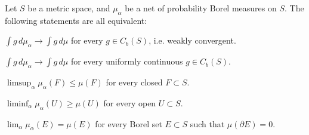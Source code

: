 \documentclass[10pt]{article}
\begin{document}
\begin{lem}
Let $S$ be a metric space, and $\mu_\alpha$ be a net of probability Borel measures on $S$.
The following statements are all equivalent:
\begin{parts}
\item $\int g\,d\mu_\alpha\to\int g\,d\mu$ for every $g\in C_b(S)$, i.e. weakly convergent.
\item $\int g\,d\mu_\alpha\to\int g\,d\mu$ for every uniformly continuous $g\in C_b(S)$.
\item $\limsup_{\alpha}\mu_\alpha(F)\le\mu(F)$ for every closed $F\subset S$.
\item $\liminf_{\alpha}\mu_\alpha(U)\ge\mu(U)$ for every open $U\subset S$.
\item $\lim_{\alpha}\mu_\alpha(E)=\mu(E)$ for every Borel set $E\subset S$ such that $\mu(\partial E)=0$.
\end{parts}
\end{lem}
\end{document}

